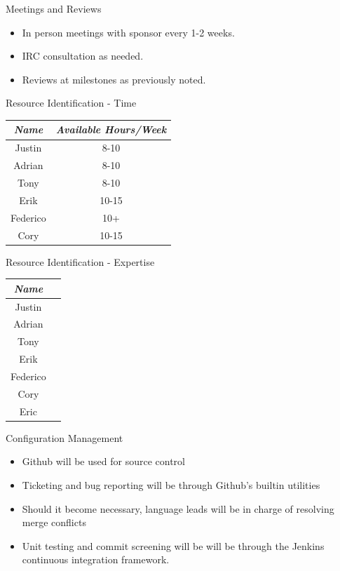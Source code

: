 \documentclass{beamer}
\begin{document}
\begin{frame}{Meetings and Reviews}
  \begin{itemize}
  \item In person meetings with sponsor every 1-2 weeks.
  \item IRC consultation as needed.
  \item Reviews at milestones as previously noted.
  \end{itemize}
\end{frame}

\begin{frame}{Resource Identification - Time}
  \begin{center}
    \begin{tabular}{|c|c|}
      \hline
      \emph{Name} & \emph{Available Hours/Week}\\ \hline \hline
      Justin & 8-10\\ \hline
      Adrian & 8-10\\ \hline
      Tony & 8-10\\ \hline
      Erik & 10-15\\ \hline
      Federico & 10+\\ \hline
      Cory & 10-15 \\
      \hline
    \end{tabular}
  \end{center}
\end{frame}

\begin{frame}{Resource Identification - Expertise}
  \begin{center}
    \begin{tabular}{|c|c|}
      \hline
      \emph{Name} & \emph{}\\ \hline \hline
      Justin & \\ \hline
      Adrian & \\ \hline
      Tony & \\ \hline
      Erik & \\ \hline
      Federico & \\ \hline
      Cory & \\ \hline
      Eric & \\ 
      \hline
    \end{tabular}
  \end{center}
\end{frame}

\begin{frame}{Configuration Management}
  \begin{itemize}
  \item Github will be used for source control
  \item Ticketing and bug reporting will be through Github's builtin utilities
  \item Should it become necessary, language leads will be in charge of resolving merge conflicts
  \item Unit testing and commit screening will be will be through the Jenkins continuous integration framework.
  \end{itemize}
\end{frame}
\end{document}
